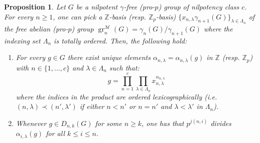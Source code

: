 \documentclass{amsart}
\theoremstyle{plain}
\newtheorem{prop}{Proposition}
\theoremstyle{definition}
\numberwithin{theorem}{section}
\numberwithin{equation}{section}
\newcommand{\grM}{\operatorname{gr}^{\mathscr M}}
\newcommand{\Z}{\mathbb Z}
\begin{document}
\begin{prop}\label{prop:basis}
    Let $G$ be a nilpotent $\gamma$-free (pro-$p$) group of nilpotency class $c$. For every $n \geq 1$, one can pick a $\Z$-basis (resp. $\Z_p$-basis) $\{x_{n, \lambda} \gamma_{n+1}(G)\}_{\lambda \in \Lambda_n}$ of the free abelian (pro-$p$) group $\grM_n(G) = \gamma_n(G)/\gamma_{n+1}(G)$ where the indexing set $\Lambda_n$ is totally ordered. Then, the following hold:

    \begin{enumerate}
        \item For every $g \in G$ there exist unique elements $\alpha_{n, \lambda} = \alpha_{n, \lambda}(g)$ in $\Z$ (resp. $\Z_p$) with $n \in \{1, \dots, c\}$ and $\lambda \in \Lambda_n$ such that: 
        \[
            g = \prod_{n = 1}^c \prod_{\lambda \in \Lambda_n} x_{n, \lambda}^{\alpha_{n, \lambda}}
        \]
        where the indices in the product are ordered lexicographically (i.e. $(n, \lambda) \prec (n', \lambda')$ if either $n < n'$ or $n = n'$ and $\lambda < \lambda'$ in $\Lambda_n$).

        \item Whenever $g \in D_{n,k}(G)$ for some $n \geq k$, one has that $p^{j(n, i)}$ divides $\alpha_{i, \lambda}(g)$ for all $k \leq i \leq n$.
    \end{enumerate}
\end{prop}
\end{document}
